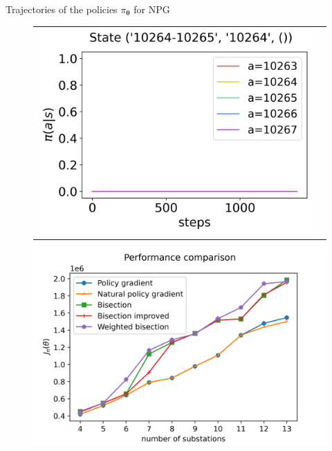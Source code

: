 \documentclass[10pt, aspectratio=169, compress, protectframetitle, handout]{beamer}
\begin{document}
\begin{frame}{Trajectories of the policies $\pi_{\boldsymbol \theta}$ for NPG}
\begin{figure}
\begin{tabular}{cc}
            \hspace*{-18pt}\includegraphics[scale=0.34,valign=b]{figures/policy_NPG_state_3.png}
        \end{tabular}
    \end{figure}
    
\end{frame}

\begin{frame}{}

    \begin{figure}
        \centering
        \includegraphics[scale=0.85]{figures/comparison_graph.png}
    \end{figure}
    
\end{frame}
\end{document}
